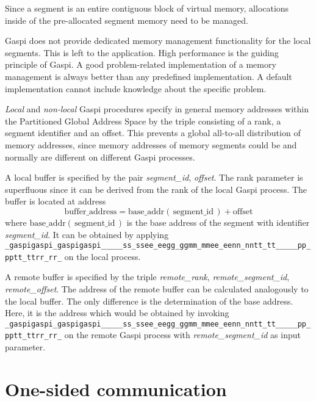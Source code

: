 \documentclass[a4paper]{article}
\makeatletter
\newlength{\lw}\setlength{\lw}{0.4pt}
\newlength{\st}\setlength{\st}{0pt}
\newcommand{\zerowsep}{\hskip 0pt plus 0.1pt minus 0.1pt}
\newcommand{\ZSEP}[1]{\ifx#1\@@@EOZ@@@\let\next\relax\else\ifx#1\_#1\zerowsep\else#1\fi\let\next\ZSEP\fi\next}
\newcommand{\zsep}[1]{\ZSEP{}#1\@@@EOZ@@@}
\newcommand{\gaspiprefix}{gaspi}
\newcommand{\GASPI}{{\sc Gaspi}}
\newcommand{\function}[1]{{\tt #1}}
\newcommand{\parameter}[1]{{\it #1}}
\newcommand{\gaspifunction}[1]{\function{\protect\zsep{\gaspiprefix\_#1}}}
\newcommand{\gaspisemantic}[1]{{\emph{#1}}}
\makeatother
\begin{document}
Since a segment is an entire contiguous block of virtual memory,
allocations inside of the pre-allocated segment memory need to be
managed.

\GASPI{} does not provide dedicated memory management functionality
for the local segments. This is left to the application.
High performance is the guiding principle of \GASPI{}.
A good problem-related implementation of a memory management is always better
than any predefined implementation. A default implementation cannot
include knowledge about the specific problem.

\gaspisemantic{Local} and \gaspisemantic{non-local} \GASPI{} procedures
specify in general memory addresses within the Partitioned Global Address Space by
the triple consisting of a rank, a segment identifier and
an offset.  This prevents a global all-to-all distribution of memory
addresses, since memory addresses of memory segments could be and
normally are different on different \GASPI{} processes.

A local buffer is specified by the pair \parameter{segment\_id}, \parameter{offset}.
The rank parameter is superfluous since it can be derived from the rank of the local \GASPI{} process.
The buffer  is located at address
\begin{equation}
\mbox{buffer\_address} = \mbox{base\_addr}\left(\, \mbox{segment\_id} \,\right) + \mbox{offset} \nonumber
\end{equation}
where $\mbox{base\_addr}(\, \mbox{segment\_id} \,)$ is the base address of the segment with identifier
\parameter{segment\_id}.
It can be obtained by applying \gaspifunction{segment\_ptr} on the local process.

A remote buffer is specified by the triple \parameter{remote\_rank}, \parameter{remote\_segment\_id},
\parameter{remote\_offset}.
The address of the remote  buffer can be calculated analogously to the local buffer. The only
difference is the determination of the base address. Here, it is the address
which would be obtained by invoking \gaspifunction{segment\_ptr}
on the remote \GASPI{} process with \parameter{remote\_segment\_id} as input parameter.

\section{One-sided communication}
\end{document}

